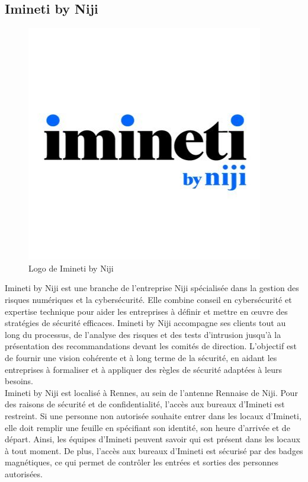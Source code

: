 \documentclass[12pt]{article}
\begin{document}
\subsection{Imineti by Niji}
\begin{figure}
    \centering
    \includegraphics[width=0.85\linewidth]{img/imineti.jpg} 
    \caption{Logo de Imineti by Niji}
    \label{fig:wrapfig}
\end{figure}
Imineti by Niji est une branche de l'entreprise Niji spécialisée dans la gestion des risques numériques et la cybersécurité. Elle combine conseil en cybersécurité et expertise technique pour aider les entreprises à définir et mettre en œuvre des stratégies de sécurité efficaces. Imineti by Niji accompagne ses clients tout au long du processus, de l'analyse des risques et des tests d'intrusion jusqu'à la présentation des recommandations devant les comités de direction. L'objectif est de fournir une vision cohérente et à long terme de la sécurité, en aidant les entreprises à formaliser et à appliquer des règles de sécurité adaptées à leurs besoins.
\\
Imineti by Niji est localisé à Rennes, au sein de l'antenne Rennaise de Niji. Pour des raisons de sécurité et de confidentialité, l'accès aux bureaux d'Imineti est restreint. Si une personne non autorisée souhaite entrer dans les locaux d'Imineti, elle doit remplir une feuille en spécifiant son identité, son heure d'arrivée et de départ. Ainsi, les équipes d'Imineti peuvent savoir qui est présent dans les locaux à tout moment. De plus, l'accès aux bureaux d'Imineti est sécurisé par des badges magnétiques, ce qui permet de contrôler les entrées et sorties des personnes autorisées.
\end{document}
